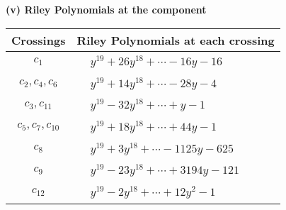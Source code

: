 \documentclass[1p]{elsarticle_modified}
\theoremstyle{definition}
\begin{document}
\flushleft \textbf{(v) Riley Polynomials at the component}\newline \\
\begin{tabular}{m{50pt}|m{274pt}}
Crossings & \hspace{64pt}Riley Polynomials at each crossing \\
\hline $$\begin{aligned}c_{1}\end{aligned}$$&$\begin{aligned}
&y^{19}+26 y^{18}+\cdots-16 y-16
\end{aligned}$\\
\hline $$\begin{aligned}c_{2},c_{4},c_{6}\end{aligned}$$&$\begin{aligned}
&y^{19}+14 y^{18}+\cdots-28 y-4
\end{aligned}$\\
\hline $$\begin{aligned}c_{3},c_{11}\end{aligned}$$&$\begin{aligned}
&y^{19}-32 y^{18}+\cdots+y-1
\end{aligned}$\\
\hline $$\begin{aligned}c_{5},c_{7},c_{10}\end{aligned}$$&$\begin{aligned}
&y^{19}+18 y^{18}+\cdots+44 y-1
\end{aligned}$\\
\hline $$\begin{aligned}c_{8}\end{aligned}$$&$\begin{aligned}
&y^{19}+3 y^{18}+\cdots-1125 y-625
\end{aligned}$\\
\hline $$\begin{aligned}c_{9}\end{aligned}$$&$\begin{aligned}
&y^{19}-23 y^{18}+\cdots+3194 y-121
\end{aligned}$\\
\hline $$\begin{aligned}c_{12}\end{aligned}$$&$\begin{aligned}
&y^{19}-2 y^{18}+\cdots+12 y^2-1
\end{aligned}$\\
\hline
\end{tabular}\\~\\
\end{document}
